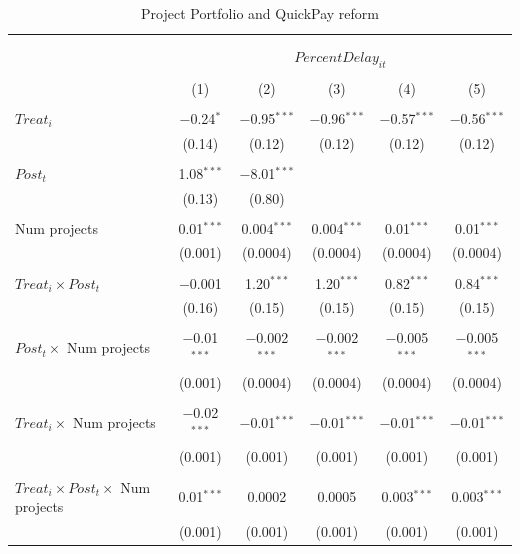 \documentclass[
]{article}
\begin{document}
\begin{table}[H] \centering 
  \caption{Project Portfolio and QuickPay reform} 
  \label{} 
\small 
\begin{tabular}{@{\extracolsep{-2pt}}lccccc} 
\\[-1.8ex]\hline 
\hline \\[-1.8ex] 
\\[-1.8ex] & \multicolumn{5}{c}{$PercentDelay_{it}$  } \\ 
\\[-1.8ex] & (1) & (2) & (3) & (4) & (5)\\ 
\hline \\[-1.8ex] 
 $Treat_i$ & $-$0.24$^{*}$ & $-$0.95$^{***}$ & $-$0.96$^{***}$ & $-$0.57$^{***}$ & $-$0.56$^{***}$ \\ 
  & (0.14) & (0.12) & (0.12) & (0.12) & (0.12) \\ 
  & & & & & \\ 
 $Post_t$ & 1.08$^{***}$ & $-$8.01$^{***}$ &  &  &  \\ 
  & (0.13) & (0.80) &  &  &  \\ 
  & & & & & \\ 
 Num projects & 0.01$^{***}$ & 0.004$^{***}$ & 0.004$^{***}$ & 0.01$^{***}$ & 0.01$^{***}$ \\ 
  & (0.001) & (0.0004) & (0.0004) & (0.0004) & (0.0004) \\ 
  & & & & & \\ 
 $Treat_i \times Post_t$ & $-$0.001 & 1.20$^{***}$ & 1.20$^{***}$ & 0.82$^{***}$ & 0.84$^{***}$ \\ 
  & (0.16) & (0.15) & (0.15) & (0.15) & (0.15) \\ 
  & & & & & \\ 
 $Post_t \times$ Num projects & $-$0.01$^{***}$ & $-$0.002$^{***}$ & $-$0.002$^{***}$ & $-$0.005$^{***}$ & $-$0.005$^{***}$ \\ 
  & (0.001) & (0.0004) & (0.0004) & (0.0004) & (0.0004) \\ 
  & & & & & \\ 
 $Treat_i \times$ Num projects & $-$0.02$^{***}$ & $-$0.01$^{***}$ & $-$0.01$^{***}$ & $-$0.01$^{***}$ & $-$0.01$^{***}$ \\ 
  & (0.001) & (0.001) & (0.001) & (0.001) & (0.001) \\ 
  & & & & & \\ 
 $Treat_i \times Post_t \times$ Num projects & 0.01$^{***}$ & 0.0002 & 0.0005 & 0.003$^{***}$ & 0.003$^{***}$ \\ 
  & (0.001) & (0.001) & (0.001) & (0.001) & (0.001) \\ 

\end{tabular}
\end{table}
\end{document}
